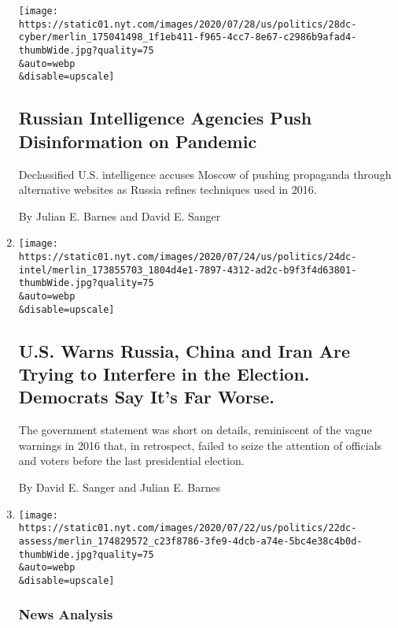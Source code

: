 \begin{enumerate}
  \texttt{[image: https://static01.nyt.com/images/2020/07/28/us/politics/28dc-cyber/merlin\_175041498\_1f1eb411-f965-4cc7-8e67-c2986b9afad4-thumbWide.jpg?quality=75\\\&auto=webp\\\&disable=upscale]}

  \hypertarget{russian-intelligence-agencies-push-disinformation-on-pandemic}{%
  \subsection{Russian Intelligence Agencies Push Disinformation on
  Pandemic}\label{russian-intelligence-agencies-push-disinformation-on-pandemic}}

  Declassified U.S. intelligence accuses Moscow of pushing propaganda
  through alternative websites as Russia refines techniques used in
  2016.

  By Julian E. Barnes and David E. Sanger
\item
  \href{/2020/07/24/us/politics/election-interference-russia-china-iran.html}{}

  \texttt{[image: https://static01.nyt.com/images/2020/07/24/us/politics/24dc-intel/merlin\_173855703\_1804d4e1-7897-4312-ad2c-b9f3f4d63801-thumbWide.jpg?quality=75\\\&auto=webp\\\&disable=upscale]}

  \hypertarget{us-warns-russia-china-and-iran-are-trying-to-interfere-in-the-election-democrats-say-its-far-worse}{%
  \subsection{U.S. Warns Russia, China and Iran Are Trying to Interfere
  in the Election. Democrats Say It's Far
  Worse.}\label{us-warns-russia-china-and-iran-are-trying-to-interfere-in-the-election-democrats-say-its-far-worse}}

  The government statement was short on details, reminiscent of the
  vague warnings in 2016 that, in retrospect, failed to seize the
  attention of officials and voters before the last presidential
  election.

  By David E. Sanger and Julian E. Barnes
\item
  \href{/2020/07/22/us/politics/china-russia-trump-cyberattacks.html}{}

  \texttt{[image: https://static01.nyt.com/images/2020/07/22/us/politics/22dc-assess/merlin\_174829572\_c23f8786-3fe9-4dcb-a74e-5bc4e38c4b0d-thumbWide.jpg?quality=75\\\&auto=webp\\\&disable=upscale]}

  \hypertarget{news-analysis-1}{%
  \subsubsection{News Analysis}\label{news-analysis-1}}


\end{enumerate}
